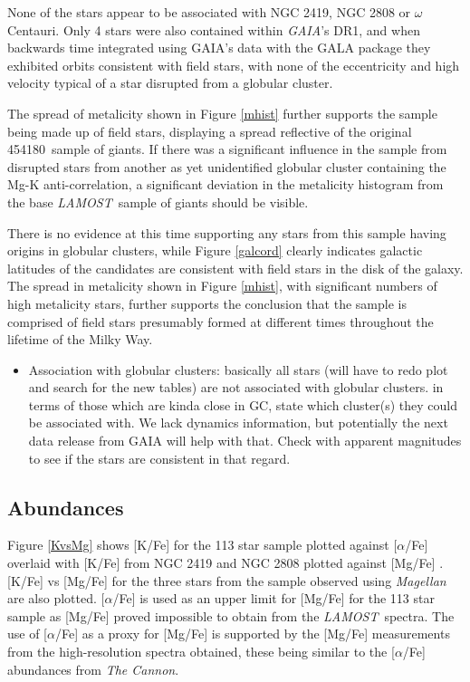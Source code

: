 \documentclass[a4paper,fleqn,usenatbib]{mnras}
\newcommand{\LamostGiants}{454180}
\newcommand{\project}[1]{\emph{#1}}
\newcommand{\lamost}{\project{LAMOST}}
\newcommand{\tc}{\project{The Cannon}}
\begin{document}
None of the stars appear to be associated with NGC 2419, NGC 2808 or $\omega$ Centauri. Only 4 stars were also contained within \textit{GAIA}'s DR1, and when backwards time integrated using GAIA's data with the GALA package they exhibited orbits consistent with field stars, with none of the eccentricity and high velocity typical of a star disrupted from a globular cluster.

The spread of metalicity shown in Figure \ref{mhist} further supports the sample being made up of field stars, displaying a spread reflective of the original \LamostGiants \ sample of giants. If there was a significant influence in the sample from disrupted stars from another as yet unidentified globular cluster containing the Mg-K anti-correlation, a significant deviation in the metalicity histogram from the base \lamost \ sample of giants should be visible.

There is no evidence at this time supporting any stars from this sample having origins in globular clusters, while Figure \ref{galcord} clearly indicates galactic latitudes of the candidates are consistent with field stars in the disk of the galaxy. The spread in metalicity shown in Figure \ref{mhist}, with significant numbers of high metalicity stars, further supports the conclusion that the sample is comprised of field stars presumably formed at different times throughout the lifetime of the Milky Way.

\begin{itemize}
\item Association with globular clusters: basically all stars (will have to redo plot and search for the new tables) are not associated with globular clusters. in terms of those which are kinda close in GC, state which cluster(s) they could be associated with. We lack dynamics information, but potentially the next data release from GAIA will help with that. Check with apparent magnitudes to see if the stars are consistent in that regard.
\end{itemize}



\subsection{Abundances}

Figure \ref{KvsMg} shows [K/Fe]  for the 113 star sample plotted against $[\alpha$/Fe] overlaid with [K/Fe] from NGC 2419 and NGC 2808 plotted against [Mg/Fe] \citep{cohenkirby2012,mucciarelli2012,mucciarelli2015}. [K/Fe] vs [Mg/Fe] for the three stars from the sample observed using \textit{Magellan} are also plotted. $[\alpha$/Fe] is used as an upper limit for [Mg/Fe] for the 113 star sample as [Mg/Fe] proved impossible to obtain from the \lamost \ spectra. The use of [$\alpha$/Fe] as a proxy for [Mg/Fe] is supported by the [Mg/Fe] measurements from the high-resolution spectra obtained, these being similar to the [$\alpha$/Fe] abundances from \tc.
\end{document}

